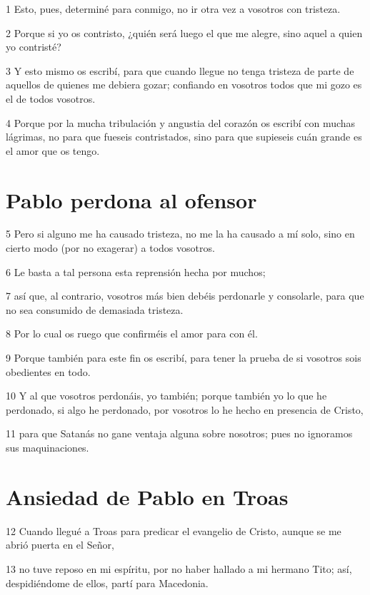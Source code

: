 \par 1 Esto, pues, determiné para conmigo, no ir otra vez a vosotros con tristeza.
\par 2 Porque si yo os contristo, ¿quién será luego el que me alegre, sino aquel a quien yo contristé?
\par 3 Y esto mismo os escribí, para que cuando llegue no tenga tristeza de parte de aquellos de quienes me debiera gozar; confiando en vosotros todos que mi gozo es el de todos vosotros.
\par 4 Porque por la mucha tribulación y angustia del corazón os escribí con muchas lágrimas, no para que fueseis contristados, sino para que supieseis cuán grande es el amor que os tengo.

\section*{Pablo perdona al ofensor}

\par 5 Pero si alguno me ha causado tristeza, no me la ha causado a mí solo, sino en cierto modo (por no exagerar) a todos vosotros.
\par 6 Le basta a tal persona esta reprensión hecha por muchos;
\par 7 así que, al contrario, vosotros más bien debéis perdonarle y consolarle, para que no sea consumido de demasiada tristeza.
\par 8 Por lo cual os ruego que confirméis el amor para con él.
\par 9 Porque también para este fin os escribí, para tener la prueba de si vosotros sois obedientes en todo.
\par 10 Y al que vosotros perdonáis, yo también; porque también yo lo que he perdonado, si algo he perdonado, por vosotros lo he hecho en presencia de Cristo,
\par 11 para que Satanás no gane ventaja alguna sobre nosotros; pues no ignoramos sus maquinaciones.

\section*{Ansiedad de Pablo en Troas}

\par 12 Cuando llegué a Troas para predicar el evangelio de Cristo, aunque se me abrió puerta en el Señor,
\par 13 no tuve reposo en mi espíritu, por no haber hallado a mi hermano Tito; así, despidiéndome de ellos, partí para Macedonia.

